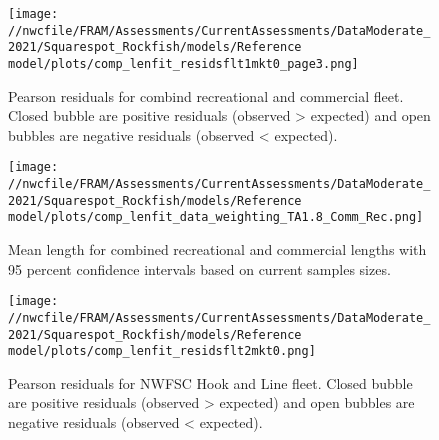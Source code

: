\documentclass[11pt,
  english,
  a4paper,
]{article}
\begin{document}
\tagmcend\tagstructend


\begin{figure}
\centering
\texttt{[image: //nwcfile/FRAM/Assessments/CurrentAssessments/DataModerate\_2021/Squarespot\_Rockfish/models/Reference model/plots/comp\_lenfit\_residsflt1mkt0\_page3.png]}
\caption{Pearson residuals for combind recreational and commercial fleet. Closed bubble are positive residuals (observed \textgreater{} expected) and open bubbles are negative residuals (observed \textless{} expected).\label{fig:rec-com-pearson}}
\end{figure}

\tagmcend\tagstructend


\begin{figure}
\centering
\texttt{[image: //nwcfile/FRAM/Assessments/CurrentAssessments/DataModerate\_2021/Squarespot\_Rockfish/models/Reference model/plots/comp\_lenfit\_data\_weighting\_TA1.8\_Comm\_Rec.png]}
\caption{Mean length for combined recreational and commercial lengths with 95 percent confidence intervals based on current samples sizes.\label{fig:rec-com-mean-len-fit}}
\end{figure}

\tagmcend\tagstructend


\begin{figure}
\centering
\texttt{[image: //nwcfile/FRAM/Assessments/CurrentAssessments/DataModerate\_2021/Squarespot\_Rockfish/models/Reference model/plots/comp\_lenfit\_residsflt2mkt0.png]}
\caption{Pearson residuals for NWFSC Hook and Line fleet. Closed bubble are positive residuals (observed \textgreater{} expected) and open bubbles are negative residuals (observed \textless{} expected).\label{fig:hkl-pearson}}
\end{figure}
\end{document}
